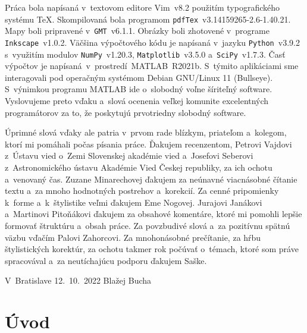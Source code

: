 \documentclass[a4paper,12pt]{book}
\begin{document}
Práca bola napísaná v~textovom editore Vim~v8.2 použitím typografického systému
\TeX.  Skompilovaná bola programom \texttt{pdfTex}~v3.14159265-2.6-1.40.21.
Mapy boli pripravené v~\texttt{GMT}~v6.1.1.  Obrázky boli zhotovené v~programe
\texttt{Inkscape}~v1.0.2.  Väčšina výpočtového kódu je napísaná
v~jazyku \texttt{Python}~v3.9.2 s~využitím modulov
\texttt{NumPy}~v1.20.3, \texttt{Matplotlib}~v3.5.0 a~\texttt{SciPy}~v1.7.3.
Časť výpočtov je napísaná~v~prostredí~MATLAB~R2021b.
S~týmito aplikáciami sme interagovali pod operačným systémom Debian GNU/Linux
11 (Bullseye).  S~výnimkou programu MATLAB ide o~slobodný voľne šíriteľný
software.  Vyslovujeme preto vďaku a~slová ocenenia veľkej komunite
excelentných programátorov za to, že poskytujú prvotriedny slobodný software.

Úprimné slová vďaky ale patria v~prvom rade blízkym, priateľom a~kolegom, ktorí 
mi pomáhali počas písania práce.  Ďakujem recenzentom, Petrovi Vajdovi z~Ústavu 
vied o~Zemi Slovenskej akadémie vied a~Josefovi Seberovi z~Astronomického 
ústavu Akadémie Vied Českej republiky, za ich ochotu a~venovaný čas.  Zuzane 
Minarechovej ďakujem za neúnavné viacnásobné čítanie textu a~za mnoho 
hodnotných postrehov a~korekcií.  Za cenné pripomienky k~forme a~k~štylistike 
veľmi ďakujem Eme Nogovej.  Jurajovi Janákovi a~Martinovi Pitoňákovi ďakujem za 
obsahové komentáre, ktoré mi pomohli lepšie formovať štruktúru a~obsah práce.  
Za povzbudivé slová a~za pozitívnu spätnú väzbu vďačím Palovi Zahorcovi.  Za 
mnohonásobné prečítanie, za hŕbu štylistických korektúr, za ochotu takmer rok 
počúvať o~témach, ktoré som práve spracovával a~za neutíchajúcu podporu ďakujem 
Saške.


\vspace{4ex}

\noindent V~Bratislave 12.~10.~2022 \hfill Blažej Bucha






\tableofcontents
\newpage







\chapter*{Úvod}
\label{sec:introduction}
\end{document}
